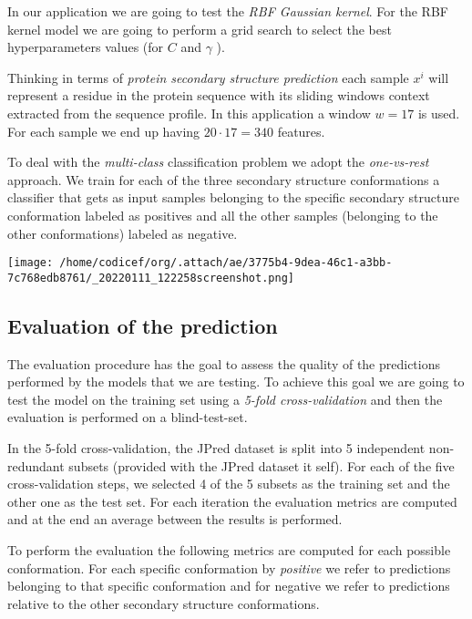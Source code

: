 \documentclass[a4paper,twocolumn]{article}
\begin{document}
In our application we are going to test the \emph{RBF Gaussian kernel}.
For the RBF kernel model we are going to perform a grid search to select the best hyperparameters values (for \(C\) and \(\gamma\) ).


Thinking in terms of \emph{protein secondary structure prediction} each sample
\(x^{i}\) will represent a residue in the protein sequence with its sliding
windows context extracted from the sequence profile. In this application a
window \(w=17\) is used. For each sample we end up having \(20 \cdot 17=340\) features.

To deal with the \emph{multi-class} classification problem we adopt the \emph{one-vs-rest} approach.
We train for each of the three secondary structure conformations a classifier that gets as input
samples belonging to the specific secondary structure conformation labeled as positives and all the other samples (belonging to the other conformations) labeled as negative.

\begin{center}
\texttt{[image: /home/codicef/org/.attach/ae/3775b4-9dea-46c1-a3bb-7c768edb8761/\_20220111\_122258screenshot.png]}
\end{center}


\subsection{Evaluation of the prediction}
\label{sec:org45a1633}
The evaluation procedure has the goal to assess the quality of the predictions
performed by the models that we are testing. To achieve this goal we are going
to test the model on the training set using a \emph{5-fold cross-validation} and then
the evaluation is performed on a blind-test-set.

In the 5-fold cross-validation, the JPred dataset is split into 5 independent
non-redundant subsets (provided with the JPred dataset it self). For each of the five cross-validation steps, we selected
4 of the 5 subsets as the training set and the other one as the test set. For
each iteration the evaluation metrics are computed and at the end an average
between the results is performed.

To perform the evaluation the following metrics are computed for each possible
conformation. For each specific conformation by \emph{positive} we refer to predictions
belonging to that specific conformation and for negative we refer to predictions
relative to the other secondary structure conformations.
\end{document}

